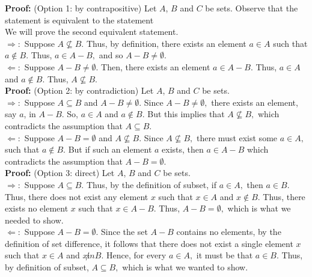 \documentclass[11pt]{article}
\begin{document}
\begin{enumerate}
\textbf{Proof:} (Option 1: by contrapositive) Let $A$, $B$ and $C$ be sets. Observe that the statement  is equivalent to the statement\\  We will prove the second equivalent statement.\\
 
 $\Rightarrow:$ Suppose $A \not\subseteq B.$ Thus, by definition, there exists an element $a \in A$ such that $a \not \in B.$ Thus, $a \in A-B,$ and so $A-B \not = \emptyset.$\\
 
 $\Leftarrow:$ Suppose $A-B\not=\emptyset.$ Then, there exists an element $a \in A-B.$ Thus, $a \in A$ and $a \not \in B.$ Thus, $A \not\subseteq B.$ \\
 
 \textbf{Proof:} (Option 2: by contradiction) Let $A$, $B$ and $C$ be sets.\\
 $\Rightarrow:$ Suppose $A \subseteq B$ and $A-B \not = \emptyset.$ Since $A-B \not = \emptyset,$ there exists an element, say $a$, in $A-B.$ So, $a \in A$ and $a \not \in B. $ But this implies that $A \not \subseteq B,$ which contradicts the assumption that $A \subseteq B.$\\
  
 $\Leftarrow:$ Suppose $A -B = \emptyset$ and $A \not\subseteq B.$ Since $A \not\subseteq B,$ there must exist some $a \in A,$  such that $a \not\in B.$ But if such an element $a$ exists, then $a \in A-B$ which contradicts the assumption that $A-B=\emptyset.$\\
  
 \textbf{Proof:} (Option 3: direct) Let $A$, $B$ and $C$ be sets.\\
 
 $\Rightarrow:$ Suppose $A \subseteq B.$ Thus, by the definition of subset, if $a \in A,$ then $a \in B. $ Thus, there does not exist any element $x$ such that $x \in A$ and $x \not \in B.$ Thus, there exists no element $x$ such that $x \in A-B.$ Thus, $A-B=\emptyset,$ which is what we needed to show. \\
 
 $\Leftarrow:$ Suppose $A -B = \emptyset.$ Since the set $A-B$ contains no elements, by the definition of set difference, it follows that there does not exist a single element $x$ such that $x \in A$ and $x \not in B.$ Hence, for every $a \in A,$ it must be that $a \in B.$ Thus, by definition of subset, $A \subseteq B,$ which is what we wanted to show. 


\end{enumerate}
\end{document}
